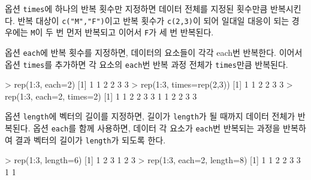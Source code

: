\documentclass[
]{book}
\newenvironment{Shaded}{\begin{snugshade}}{\end{snugshade}}
\newcommand{\AttributeTok}[1]{\textcolor[rgb]{0.77,0.63,0.00}{#1}}
\newcommand{\DecValTok}[1]{\textcolor[rgb]{0.00,0.00,0.81}{#1}}
\newcommand{\FunctionTok}[1]{\textcolor[rgb]{0.00,0.00,0.00}{#1}}
\newcommand{\NormalTok}[1]{#1}
\newcommand{\SpecialCharTok}[1]{\textcolor[rgb]{0.00,0.00,0.00}{#1}}
\begin{document}
옵션 \texttt{times}에 하나의 반복 횟수만 지정하면 데이터 전체를 지정된 횟수만큼 반복시킨다. 반복 대상이 \texttt{c("M","F")}이고 반복 횟수가 \texttt{c(2,3)}이 되어 일대일 대응이 되는 경우에는 \texttt{M}이 두 번 먼저 반복되고 이어서 \texttt{F}가 세 번 반복된다.

옵션 \texttt{each}에 반복 횟수를 지정하면, 데이터의 요소들이 각각 each번 반복한다. 이어서 옵션 \texttt{times}를 추가하면 각 요소의 \texttt{each}번 반복 과정 전체가 \texttt{times}만큼 반복된다.

\begin{Shaded}
\begin{Highlighting}[]
\SpecialCharTok{\textgreater{}} \FunctionTok{rep}\NormalTok{(}\DecValTok{1}\SpecialCharTok{:}\DecValTok{3}\NormalTok{, }\AttributeTok{each=}\DecValTok{2}\NormalTok{)}
\NormalTok{[}\DecValTok{1}\NormalTok{] }\DecValTok{1} \DecValTok{1} \DecValTok{2} \DecValTok{2} \DecValTok{3} \DecValTok{3}
\SpecialCharTok{\textgreater{}} \FunctionTok{rep}\NormalTok{(}\DecValTok{1}\SpecialCharTok{:}\DecValTok{3}\NormalTok{, }\AttributeTok{times=}\FunctionTok{rep}\NormalTok{(}\DecValTok{2}\NormalTok{,}\DecValTok{3}\NormalTok{))}
\NormalTok{[}\DecValTok{1}\NormalTok{] }\DecValTok{1} \DecValTok{1} \DecValTok{2} \DecValTok{2} \DecValTok{3} \DecValTok{3}
\SpecialCharTok{\textgreater{}} \FunctionTok{rep}\NormalTok{(}\DecValTok{1}\SpecialCharTok{:}\DecValTok{3}\NormalTok{, }\AttributeTok{each=}\DecValTok{2}\NormalTok{, }\AttributeTok{times=}\DecValTok{2}\NormalTok{)}
\NormalTok{ [}\DecValTok{1}\NormalTok{] }\DecValTok{1} \DecValTok{1} \DecValTok{2} \DecValTok{2} \DecValTok{3} \DecValTok{3} \DecValTok{1} \DecValTok{1} \DecValTok{2} \DecValTok{2} \DecValTok{3} \DecValTok{3}
\end{Highlighting}
\end{Shaded}

옵션 \texttt{length}에 벡터의 길이를 지정하면, 길이가 \texttt{length}가 될 때까지 데이터 전체가 반복된다. 옵션 \texttt{each}를 함께 사용하면, 데이터 각 요소가 \texttt{each}번 반복되는 과정을 반복하여 결과 벡터의 길이가 \texttt{length}가 되도록 한다.

\begin{Shaded}
\begin{Highlighting}[]
\SpecialCharTok{\textgreater{}} \FunctionTok{rep}\NormalTok{(}\DecValTok{1}\SpecialCharTok{:}\DecValTok{3}\NormalTok{, }\AttributeTok{length=}\DecValTok{6}\NormalTok{)}
\NormalTok{[}\DecValTok{1}\NormalTok{] }\DecValTok{1} \DecValTok{2} \DecValTok{3} \DecValTok{1} \DecValTok{2} \DecValTok{3}
\SpecialCharTok{\textgreater{}} \FunctionTok{rep}\NormalTok{(}\DecValTok{1}\SpecialCharTok{:}\DecValTok{3}\NormalTok{, }\AttributeTok{each=}\DecValTok{2}\NormalTok{, }\AttributeTok{length=}\DecValTok{8}\NormalTok{)}
\NormalTok{[}\DecValTok{1}\NormalTok{] }\DecValTok{1} \DecValTok{1} \DecValTok{2} \DecValTok{2} \DecValTok{3} \DecValTok{3} \DecValTok{1} \DecValTok{1}
\end{Highlighting}
\end{Shaded}
\end{document}
